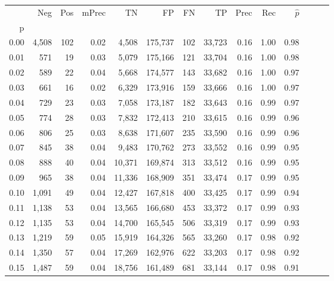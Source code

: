 \begin{tabular}{rrrrrrrrrrrrrr}
\toprule
{} &    Neg &    Pos & mPrec &       TN &       FP &      FN &      TP &  Prec &   Rec & $\hat{p}$ \\
p    &        &        &       &          &          &         &         &       &       &           \\
\midrule
0.00 &  4,508 &    102 &  0.02 &    4,508 &  175,737 &     102 &  33,723 &  0.16 &  1.00 &      0.98 \\
0.01 &    571 &     19 &  0.03 &    5,079 &  175,166 &     121 &  33,704 &  0.16 &  1.00 &      0.98 \\
0.02 &    589 &     22 &  0.04 &    5,668 &  174,577 &     143 &  33,682 &  0.16 &  1.00 &      0.97 \\
0.03 &    661 &     16 &  0.02 &    6,329 &  173,916 &     159 &  33,666 &  0.16 &  1.00 &      0.97 \\
0.04 &    729 &     23 &  0.03 &    7,058 &  173,187 &     182 &  33,643 &  0.16 &  0.99 &      0.97 \\
0.05 &    774 &     28 &  0.03 &    7,832 &  172,413 &     210 &  33,615 &  0.16 &  0.99 &      0.96 \\
0.06 &    806 &     25 &  0.03 &    8,638 &  171,607 &     235 &  33,590 &  0.16 &  0.99 &      0.96 \\
0.07 &    845 &     38 &  0.04 &    9,483 &  170,762 &     273 &  33,552 &  0.16 &  0.99 &      0.95 \\
0.08 &    888 &     40 &  0.04 &   10,371 &  169,874 &     313 &  33,512 &  0.16 &  0.99 &      0.95 \\
0.09 &    965 &     38 &  0.04 &   11,336 &  168,909 &     351 &  33,474 &  0.17 &  0.99 &      0.95 \\
0.10 &  1,091 &     49 &  0.04 &   12,427 &  167,818 &     400 &  33,425 &  0.17 &  0.99 &      0.94 \\
0.11 &  1,138 &     53 &  0.04 &   13,565 &  166,680 &     453 &  33,372 &  0.17 &  0.99 &      0.93 \\
0.12 &  1,135 &     53 &  0.04 &   14,700 &  165,545 &     506 &  33,319 &  0.17 &  0.99 &      0.93 \\
0.13 &  1,219 &     59 &  0.05 &   15,919 &  164,326 &     565 &  33,260 &  0.17 &  0.98 &      0.92 \\
0.14 &  1,350 &     57 &  0.04 &   17,269 &  162,976 &     622 &  33,203 &  0.17 &  0.98 &      0.92 \\
0.15 &  1,487 &     59 &  0.04 &   18,756 &  161,489 &     681 &  33,144 &  0.17 &  0.98 &      0.91 \\

\end{tabular}
